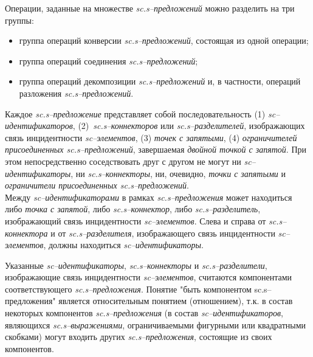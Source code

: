 Операции, заданные на множестве \textit{sc.s--предложений} можно разделить на три группы:
\begin{itemize}
	\item группа операций конверсии \textit{sc.s--предложений}, состоящая из одной операции;
	\item группа операций соединения \textit{sc.s--предложений};
	\item группа операций декомпозиции \textit{sc.s--предложений} и, в частности, операций разложения \textit{sc.s--предложений}.
\end{itemize}



Каждое \textit{sc.s--предложение} представляет собой последовательность (1) \textit{sc--идентификаторов}, \mbox{(2) \textit{sc.s--коннекторов}} или \textit{sc.s--разделителей}, изображающих связь инцидентности \textit{sc--элементов}, (3) \textit{точек с запятыми}, (4) \textit{ограничителей присоединенных sc.s--предложений}, завершаемая \textit{двойной точкой с запятой}. При этом непосредственно соседствовать друг с другом не могут ни \textit{\mbox{sc--идентификаторы}}, ни \textit{\mbox{sc.s--коннекторы}}, ни, очевидно, \textit{точки с запятыми} и \textit{ограничители присоединенных sc.s--предложений}.\\
Между \textit{sc--идентификаторами} в рамках \textit{sc.s--предложения} может находиться либо \textit{точка с запятой}, либо \textit{sc.s--коннектор}, либо \textit{sc.s--разделитель}, изображающий связь инцидентности \textit{sc--элементов}. Слева и справа от \textit{sc.s--коннектора} и от \textit{sc.s--разделителя}, изображающего связь инцидентности \textit{sc--элементов}, должны находиться \textit{sc--идентификаторы}.

Указанные \textit{sc--идентификаторы}, \textit{sc.s--коннекторы} и \textit{sc.s--разделители}, изображающие связь инцидентности \textit{sc--элементов}, считаются компонентами соответствующего \textit{sc.s--предложения}. Понятие "быть компонентом sc.s--предложения"{} является относительным понятием (отношением), т.к. в состав некоторых компонентов \textit{sc.s--предложения} (в состав \textit{sc--идентификаторов}, являющихся \textit{sc.s--выражениями}, ограничиваемыми фигурными или квадратными скобками) могут входить других \textit{sc.s--предложения}, состоящие из своих компонентов.

